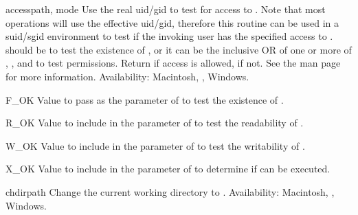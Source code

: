 \begin{funcdesc}{access}{path, mode}
Use the real uid/gid to test for access to .  Note that most
operations will use the effective uid/gid, therefore this routine can
be used in a suid/sgid environment to test if the invoking user has the
specified access to .   should be 
to test the existence of , or it can be the inclusive OR of
one or more of , , and  to
test permissions.  Return  if access is allowed,
 if not.
See the \UNIX{} man page  for more information.
Availability: Macintosh, \UNIX, Windows.


\end{funcdesc}

\begin{datadesc}{F_OK}
  Value to pass as the  parameter of  to
  test the existence of .
\end{datadesc}

\begin{datadesc}{R_OK}
  Value to include in the  parameter of 
  to test the readability of .
\end{datadesc}

\begin{datadesc}{W_OK}
  Value to include in the  parameter of 
  to test the writability of .
\end{datadesc}

\begin{datadesc}{X_OK}
  Value to include in the  parameter of 
  to determine if  can be executed.
\end{datadesc}

\begin{funcdesc}{chdir}{path}
Change the current working directory to .
Availability: Macintosh, \UNIX, Windows.
\end{funcdesc}

